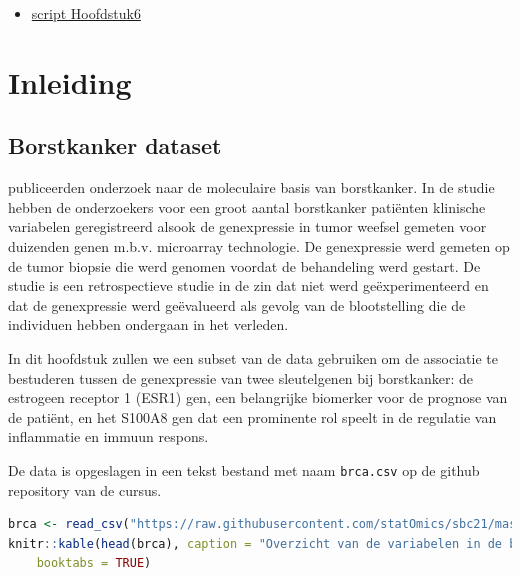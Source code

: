\documentclass[
  12pt,dutch,coursenotes]{book}
\newcommand{\passthrough}[1]{#1}
\providecommand{\tightlist}{%
  \setlength{\itemsep}{0pt}\setlength{\parskip}{0pt}}
\theoremstyle{definition}
\theoremstyle{definition}
\theoremstyle{definition}
\theoremstyle{definition}
\theoremstyle{remark}
\begin{document}
\begin{itemize}
\tightlist
\item
  \href{https://statomics.github.io/sbc21/rmd/06-linearRegression.html}{script Hoofdstuk6}
\end{itemize}

\hypertarget{inleiding-5}{%
\section{Inleiding}\label{inleiding-5}}

\hypertarget{borstkanker-dataset}{%
\subsection{Borstkanker dataset}\label{borstkanker-dataset}}

\citet{sotiriou2006} publiceerden onderzoek naar de moleculaire basis van borstkanker.
In de studie hebben de onderzoekers voor een groot aantal borstkanker patiënten klinische variabelen geregistreerd alsook de genexpressie in tumor weefsel gemeten voor duizenden genen m.b.v. microarray technologie.
De genexpressie werd gemeten op de tumor biopsie die werd genomen voordat de behandeling werd gestart.
De studie is een retrospectieve studie in de zin dat niet werd geëxperimenteerd en dat de genexpressie werd geëvalueerd als gevolg van de blootstelling die de individuen hebben ondergaan in het verleden.

In dit hoofdstuk zullen we een subset van de data gebruiken om de associatie te bestuderen tussen de genexpressie van twee sleutelgenen bij borstkanker: de estrogeen receptor 1 (ESR1) gen, een belangrijke biomerker voor de prognose van de patiënt, en het S100A8 gen dat een prominente rol speelt in de regulatie van inflammatie en immuun respons.

De data is opgeslagen in een tekst bestand met naam \passthrough{\lstinline!brca.csv!} op de github repository van de cursus.

\begin{lstlisting}[language=R]
brca <- read_csv("https://raw.githubusercontent.com/statOmics/sbc21/master/data/breastcancer.csv")
knitr::kable(head(brca), caption = "Overzicht van de variabelen in de borstkanker dataset.",
    booktabs = TRUE)
\end{lstlisting}
\end{document}
